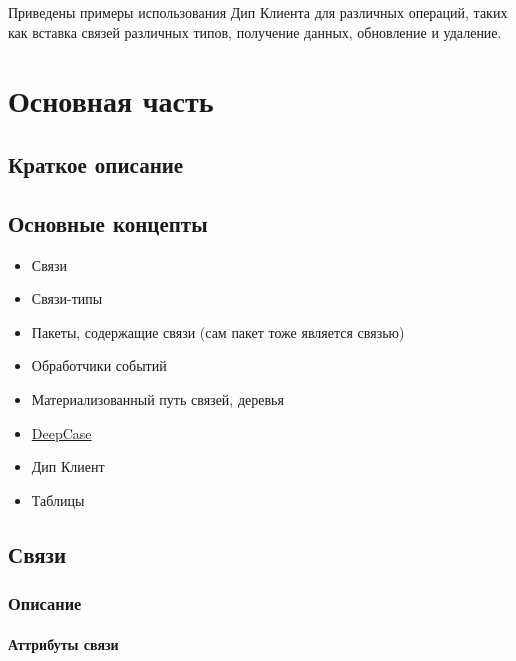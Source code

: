 \documentclass{article}
\begin{document}
Приведены примеры использования Дип Клиента для различных операций, таких как
вставка связей различных типов, получение данных, обновление и удаление.


\tableofcontents

\section{Основная часть}

\subsection{Краткое описание}

\subsection{Основные концепты}

\begin{itemize}
  \item Связи
  \item Связи-типы
  \item Пакеты, содержащие связи (сам пакет тоже является связью)
  \item Обработчики событий
  \item Материализованный путь связей, деревья
  \item \hyperlink{DeepCase.Def}{DeepCase}
  \item Дип Клиент
  \item Таблицы
\end{itemize}

\subsection{Связи}

\subsubsection{Описание}

\paragraph{Аттрибуты связи}
\end{document}
